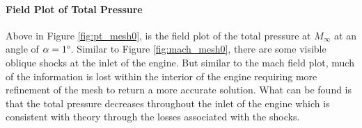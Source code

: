 \paragraph{Field Plot of Total Pressure} Above in Figure \ref{fig:pt_mesh0}, is the field plot of the total pressure at $M_\infty$ at an angle of $\alpha=1\degree$. Similar to Figure \ref{fig:mach_mesh0}, there are some visible oblique shocks at the inlet of the engine. But similar to the mach field plot, much of the information is lost within the interior of the engine requiring more refinement of the mesh to return a more accurate solution. What can be found is that the total pressure decreases throughout the inlet of the engine which is consistent with theory through the losses associated with the shocks.